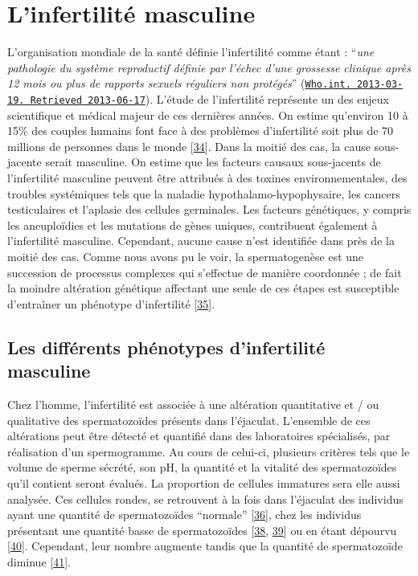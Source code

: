 \documentclass[12pt,a4paper,twoside]{ugathesis}
\theoremstyle{definition}
\theoremstyle{definition}
\theoremstyle{definition}
\theoremstyle{remark}
\begin{document}
\newpage

\section{L'infertilité masculine}\label{linfertilite-masculine}

L'organisation mondiale de la santé définie l'infertilité comme étant :
``\emph{une pathologie du système reproductif définie par l'échec d'une
grossesse clinique après 12 mois ou plus de rapports sexuels réguliers
non protégés}''
(\href{http://www.who.int/reproductivehealth/topics/infertility/definitions/en/}{\texttt{Who.int.\ 2013-03-19.\ Retrieved\ 2013-06-17}}).
L'étude de l'infertilité représente un des enjeux scientifique et
médical majeur de ces dernières années. On estime qu'environ 10 à 15\%
des couples humains font face à des problèmes d'infertilité soit plus de
70 millions de personnes dans le monde
{[}\protect\hyperlink{ref-Boivin2007a}{34}{]}. Dans la moitié des cas,
la cause sous-jacente serait masculine. On estime que les facteurs
causaux sous-jacents de l'infertilité masculine peuvent être attribués à
des toxines environnementales, des troubles systémiques tels que la
maladie hypothalamo-hypophysaire, les cancers testiculaires et l'aplasie
des cellules germinales. Les facteurs génétiques, y compris les
aneuploïdies et les mutations de gènes uniques, contribuent également à
l'infertilité masculine. Cependant, aucune cause n'est identifiée dans
près de la moitié des cas. Comme nous avons pu le voir, la
spermatogenèse est une succession de processus complexes qui s'effectue
de manière coordonnée ; de fait la moindre altération génétique
affectant une seule de ces étapes est susceptible d'entraîner un
phénotype d'infertilité
{[}\protect\hyperlink{ref-Grudzinskas1995}{35}{]}.

\subsection{Les différents phénotypes d'infertilité
masculine}\label{les-differents-phenotypes-dinfertilite-masculine}

Chez l'homme, l'infertilité est associée à une altération quantitative
et / ou qualitative des spermatozoïdes présents dans l'éjaculat.
L'ensemble de ces altérations peut être détecté et quantifié dans des
laboratoires spécialisés, par réalisation d'un spermogramme. Au cours de
celui-ci, plusieurs critères tels que le volume de sperme sécrété, son
pH, la quantité et la vitalité des spermatozoïdes qu'il contient seront
évalués. La proportion de cellules immatures sera elle aussi analysée.
Ces cellules rondes, se retrouvent à la fois dans l'éjaculat des
individus ayant une quantité de spermatozoïdes ``normale''
{[}\protect\hyperlink{ref-Michael1937}{36}{]}, chez les individus
présentant une quantité basse de spermatozoïdes
{[}\protect\hyperlink{ref-MacLeod1970}{38},
\protect\hyperlink{ref-Tomlinson1993}{39}{]} ou en étant dépourvu
{[}\protect\hyperlink{ref-Kurilo}{40}{]}. Cependant, leur nombre
augmente tandis que la quantité de spermatozoïde diminue
{[}\protect\hyperlink{ref-SPERLING1971}{41}{]}.
\end{document}

